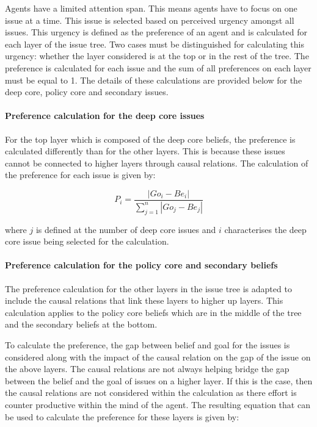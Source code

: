 \documentclass[11pt]{article}
\begin{document}
Agents have a limited attention span. This means agents have to focus on one issue at a time. This issue is selected based on perceived urgency amongst all issues. This urgency is defined as the preference of an agent and is calculated for each layer of the issue tree. Two cases must be distinguished for calculating this urgency: whether the layer considered is at the top or in the rest of the tree. The preference is calculated for each issue and the sum of all preferences on each layer must be equal to 1. The details of these calculations are provided below for the deep core, policy core and secondary issues.


\paragraph{Preference calculation for the deep core issues}
\label{sssec:prefDCissues}

For the top layer which is composed of the deep core beliefs, the preference is calculated differently than for the other layers. This is because these issues cannot be connected to higher layers through causal relations. The calculation of the preference for each issue is given by:

\begin{equation}
P_i = \frac{ |Go_i - Be_i|}{\sum_{j=1}^n |Go_j - Be_j|}
\end{equation}

where $j$ is defined at the number of deep core issues and $i$ characterises the deep core issue being selected for the calculation.


\paragraph{Preference calculation for the policy core and secondary beliefs}
\label{sssec:prefPCSissues}

The preference calculation for the other layers in the issue tree is adapted to include the causal relations that link these layers to higher up layers. This calculation applies to the policy core beliefs which are in the middle of the tree and the secondary beliefs at the bottom.

To calculate the preference, the gap between belief and goal for the issues is considered along with the impact of the causal relation on the gap of the issue on the above layers. The causal relations are not always helping bridge the gap between the belief and the goal of issues on a higher layer. If this is the case, then the causal relations are not considered within the calculation as there effort is counter productive within the mind of the agent. The resulting equation that can be used to calculate the preference for these layers is given by:
\end{document}
